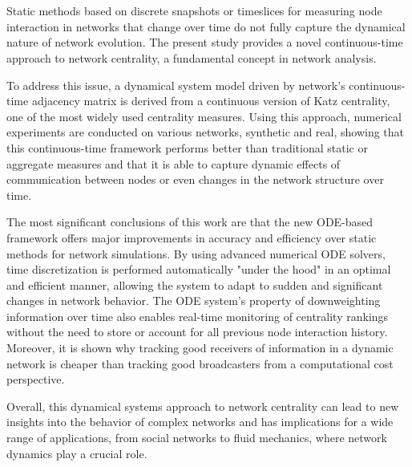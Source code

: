 
\chapter*{\abstractname}
Static methods based on discrete snapshots or timeslices for measuring node interaction in networks that change over time do not fully capture the dynamical nature of network evolution. The present study provides a novel continuous-time approach to network centrality, a fundamental concept in network analysis.

To address this issue, a dynamical system model driven by network's continuous-time adjacency matrix is derived from a continuous version of Katz centrality, one of the most widely used centrality measures. Using this approach, numerical experiments are conducted on various networks, synthetic and real, showing that this continuous-time framework performs better than traditional static or aggregate measures and that it is able to capture dynamic effects of communication between nodes or even changes in the network structure over time.

The most significant conclusions of this work are that the new ODE-based framework offers major improvements in accuracy and efficiency over static methods for network simulations. By using advanced numerical ODE solvers, time discretization is performed automatically "under the hood" in an optimal and efficient manner, allowing the system to adapt to sudden and significant changes in network behavior. The ODE system’s property of downweighting information over time also enables real-time monitoring of centrality rankings without the need to store or account for all previous node interaction history. Moreover, it is shown why tracking good receivers of information in a dynamic network is cheaper than tracking good broadcasters from a computational cost perspective. 

Overall, this dynamical systems approach to network centrality can lead to new insights into the behavior of complex networks and has implications for a wide range of applications, from social networks to fluid mechanics, where network dynamics play a crucial role.


